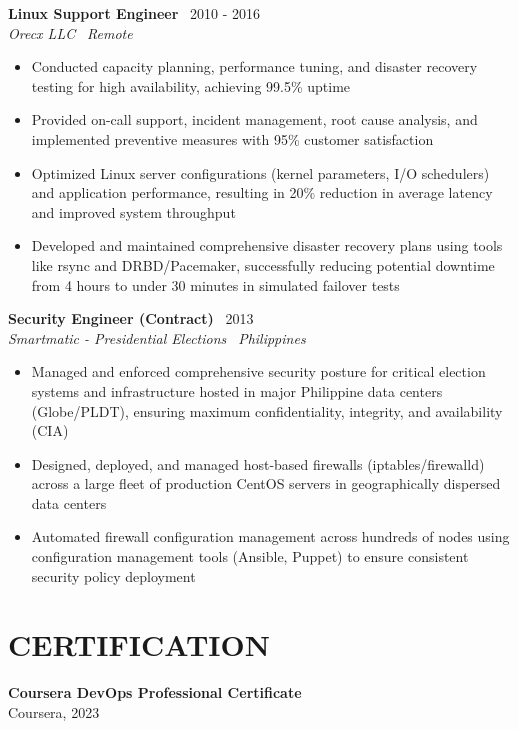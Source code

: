 \documentclass[11pt,a4paper]{article}
\newcommand{\resumeSubheading}[4]{
  \vspace{2pt}
  \textbf{#1} \hfill #2 \\
  \textit{#3} \hfill \textit{#4}
  \vspace{2pt}
}
\begin{document}
\resumeSubheading
{Linux Support Engineer}{\faCalendar\ 2010 - 2016}
{Orecx LLC}{\faMapMarker\ Remote}

\begin{itemize}[leftmargin=*, itemsep=1pt, parsep=0pt, topsep=2pt]
    \item Conducted capacity planning, performance tuning, and disaster recovery testing for high availability, achieving 99.5\% uptime
    \item Provided on-call support, incident management, root cause analysis, and implemented preventive measures with 95\% customer satisfaction
    \item Optimized Linux server configurations (kernel parameters, I/O schedulers) and application performance, resulting in 20\% reduction in average latency and improved system throughput
    \item Developed and maintained comprehensive disaster recovery plans using tools like rsync and DRBD/Pacemaker, successfully reducing potential downtime from 4 hours to under 30 minutes in simulated failover tests
\end{itemize}

\resumeSubheading
{Security Engineer (Contract)}{\faCalendar\ 2013}
{Smartmatic - Presidential Elections}{\faMapMarker\ Philippines}

\begin{itemize}[leftmargin=*, itemsep=1pt, parsep=0pt, topsep=2pt]
    \item Managed and enforced comprehensive security posture for critical election systems and infrastructure hosted in major Philippine data centers (Globe/PLDT), ensuring maximum confidentiality, integrity, and availability (CIA)
    \item Designed, deployed, and managed host-based firewalls (iptables/firewalld) across a large fleet of production CentOS servers in geographically dispersed data centers
    \item Automated firewall configuration management across hundreds of nodes using configuration management tools (Ansible, Puppet) to ensure consistent security policy deployment
\end{itemize}

\section*{CERTIFICATION}

\textbf{Coursera DevOps Professional Certificate}\\
Coursera, 2023
\end{document}
